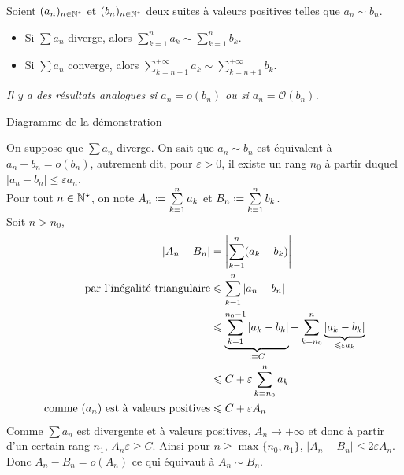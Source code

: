 \begin{prop}{}
    Soient $(a_n)_{n \in \mathbb{N}^\star}$ et $(b_n)_{n \in \mathbb{N}^\star}$ deux suites à valeurs positives telles que $a_n \sim b_n$.
    \begin{itemize}
        \item Si $ \sum a_n$ diverge, alors $\sum\limits_{k=1}^{n} a_k \sim \sum\limits_{k=1}^{n} b_k$. 
        \item Si $ \sum a_n$ converge, alors $\sum\limits_{k=n+1}^{+ \infty} a_k \sim \sum\limits_{k=n+1}^{+ \infty} b_k$. 
    \end{itemize}
    \emph{Il y a des résultats analogues si $a_n = o(b_n)$ ou si $a_n = \mathcal{O}(b_n)$.}
\end{prop}

\begin{marginfigure}[3cm]
    \centering
    \caption*{\centering Diagramme de la démonstration}
\end{marginfigure}

\begin{preuve}
    On suppose que $\sum a_n$ diverge. On sait que $a_n \sim b_n$ est équivalent à $a_n -b_n = o(b_n)$, autrement dit, pour $\varepsilon > 0$, il existe un rang $n_0$ à partir duquel $|a_n -b_n| \leqslant \varepsilon a_n$. \\
    Pour tout $n \in \mathbb{N}^\star$, on note $A_n \defeq \sum\limits_{k=1}^n a_k$ et $B_n \defeq \sum\limits_{k=1}^n b_k$. \\
    Soit $n > n_0$,
    \begin{align*}
        |A_n - B_n| &= \left|\sum_{k=1}^n (a_k - b_k) \right| \\
        \text{par l'inégalité triangulaire} &\leqslant \sum_{k=1}^n |a_n-b_n| \\
        &\leqslant \underbrace{\sum_{k=1}^{n_0-1} |a_k - b_k|}_{\defeq C} + \sum_{k=n_0}^n \underbrace{|a_k - b_k|}_{\leqslant \varepsilon a_k} \\
        &\leqslant C + \varepsilon \sum_{k=n_0}^n a_k \\
        \text{comme $(a_n)$ est à valeurs positives} &\leqslant C + \varepsilon A_n
    \end{align*}
    Comme $\sum a_n$ est divergente et à valeurs positives, $A_n \longrightarrow +\infty$ et donc à partir d'un certain rang $n_1$, $A_n \varepsilon \geqslant C$. Ainsi pour $n \geqslant \max \{ n_0, n_1 \}$, $|A_n - B_n| \leqslant 2 \varepsilon A_n$. \\ 
    Donc $A_n - B_n = o(A_n)$ ce qui équivaut à $A_n \sim B_n$.
\end{preuve}
